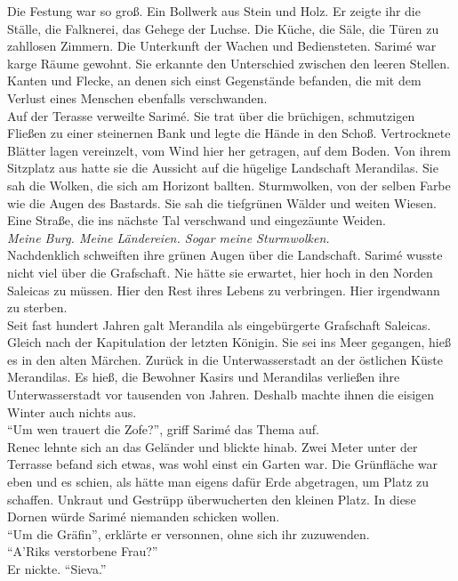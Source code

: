 Die Festung war so groß. Ein Bollwerk aus Stein und Holz. Er zeigte ihr die Ställe, die 
Falknerei, das Gehege der Luchse. Die Küche, die Säle, die Türen zu zahllosen Zimmern. 
Die Unterkunft der Wachen und Bediensteten. Sarimé war karge Räume gewohnt. Sie erkannte 
den Unterschied zwischen den leeren Stellen. Kanten und Flecke, an denen sich einst Gegenstände 
befanden, die mit dem Verlust eines Menschen ebenfalls verschwanden.\\
Auf der Terasse verweilte Sarimé. Sie trat über die brüchigen, schmutzigen Fließen zu einer 
steinernen Bank und legte die Hände in den Schoß. Vertrocknete Blätter lagen vereinzelt, vom Wind 
hier her getragen, auf dem Boden. Von ihrem Sitzplatz aus hatte sie die Aussicht auf die hügelige 
Landschaft Merandilas. Sie sah die Wolken, die sich am Horizont ballten. Sturmwolken, von der selben 
Farbe wie die Augen des Bastards. Sie sah die tiefgrünen Wälder und weiten Wiesen. Eine Straße, die 
ins nächste Tal verschwand und eingezäunte Weiden.\\
\textit{Meine Burg. Meine Ländereien. Sogar meine Sturmwolken.}\\
Nachdenklich schweiften ihre grünen Augen über die Landschaft. Sarimé wusste nicht viel über die 
Grafschaft. Nie hätte sie erwartet, hier hoch in den Norden Saleicas zu müssen. Hier den Rest 
ihres Lebens zu verbringen. Hier irgendwann zu sterben.\\
Seit fast hundert Jahren galt Merandila als eingebürgerte Grafschaft Saleicas. Gleich nach der 
Kapitulation der letzten Königin. Sie sei ins Meer gegangen, hieß es in den alten Märchen. Zurück 
in die Unterwasserstadt an der östlichen Küste Merandilas. Es hieß, die Bewohner Kasirs und 
Merandilas verließen ihre Unterwasserstadt vor tausenden von Jahren. Deshalb machte ihnen die 
eisigen Winter auch nichts aus.\\
``Um wen trauert die Zofe?'', griff Sarimé das Thema auf.\\
Renec lehnte sich an das Geländer und blickte hinab. Zwei Meter unter der Terrasse befand sich 
etwas, was wohl einst ein Garten war. Die Grünfläche war eben und es schien, als hätte man eigens 
dafür Erde abgetragen, um Platz zu schaffen. Unkraut und Gestrüpp überwucherten den kleinen Platz. 
In diese Dornen würde Sarimé niemanden schicken wollen.\\
``Um die Gräfin'', erklärte er versonnen, ohne sich ihr zuzuwenden.\\
``A'Riks verstorbene Frau?''\\
Er nickte. ``Sieva.''\\
